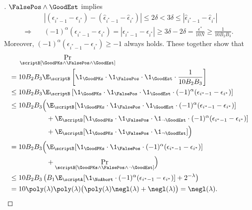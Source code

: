 \begin{proof}[]
${\FalsePos\wedge\GoodEst}$ implies
\begin{align*}
&
|
(\epsilon_{i^\ast-1}-\epsilon_{i^\ast})
-
(\widehat{\epsilon}_{i^\ast-1}-\widehat{\epsilon}_{i^\ast})
|
\leq
2\delta
<
3\delta
\leq
|\widehat{\epsilon}_{i^\ast-1}-\widehat{\epsilon}_{i^\ast}|
\\{}\Longrightarrow{}\quad&
(-1)^\alpha(\epsilon_{i^\ast-1}-\epsilon_{i^\ast})
=|\epsilon_{i^\ast-1}-\epsilon_{i^\ast}|
\geq 3\delta-2\delta
=\frac{\epsilon^\ast}{10N}
\geq\frac{1}{10B_2B_3}.
\end{align*}
Moreover, ${(-1)^\alpha(\epsilon_{i^\ast-1}-\epsilon_{i^\ast})\geq -1}$ always holds.
These together show that
\begin{align*}
&
\Pr_\scriptB[\GoodPKs\wedge\FalsePos\wedge\GoodEst]
\\{}={}&
10B_2B_3\E_\scriptB\left[
\1_\GoodPKs\cdot\1_\FalsePos\cdot\1_\GoodEst\cdot\frac{1}{10B_2B_3}
\right]
\\{}\leq{}&
10B_2B_3\E_\scriptB\left[
\1_\GoodPKs\cdot\1_\FalsePos\cdot\1_\GoodEst
\cdot(-1)^\alpha(\epsilon_{i^\ast-1}-\epsilon_{i^\ast})
\right]
\\{}\leq{}&
10B_2B_3\Bigl(
\E_\scriptB[
\1_\GoodPKs\cdot\1_\FalsePos\cdot\1_\GoodEst
\cdot(-1)^\alpha(\epsilon_{i^\ast-1}-\epsilon_{i^\ast})
]
\\&
\hphantom{10B_2B_3\Bigl({}}{}
+
\E_\scriptB[
\1_\GoodPKs\cdot\1_\FalsePos\cdot\1_{\neg\GoodEst}
\cdot(-1)^\alpha(\epsilon_{i^\ast-1}-\epsilon_{i^\ast})
]
\\&
\hphantom{10B_2B_3\Bigl({}}{}
+
\E_\scriptB[\1_\GoodPKs\cdot\1_\FalsePos\cdot\1_{\neg\GoodEst}]
\Bigr)
\\{}={}&
10B_2B_3\Bigl(
\E_\scriptB[
\1_\GoodPKs\cdot\1_\FalsePos
\cdot(-1)^\alpha(\epsilon_{i^\ast-1}-\epsilon_{i^\ast})
]
\\&\hphantom{10B_2B_3\Bigl({}}{}
+\Pr_\scriptB[\GoodPKs\wedge\FalsePos\wedge\neg\GoodEst]
\Bigr)
\\{}\leq{}&
10B_2B_3\left(
B_1\E_\scriptA[
\1_\NoAbort\cdot(-1)^\alpha(\epsilon_{i^\ast-1}-\epsilon_{i^\ast})
]
+2^{-\lambda}
\right)
\\{}={}&
10\poly(\lambda)\poly(\lambda)
\bigl(\poly(\lambda)\negl(\lambda)+\negl(\lambda)\bigr)
=\negl(\lambda).
\qedhere
\end{align*}
\end{proof}
